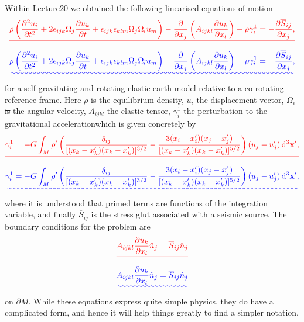 \documentclass[a4paper,12pt]{paper}
\providecommand{\DIFadd}[1]{{\protect\color{blue}\uwave{#1}}} %
\providecommand{\DIFdel}[1]{{\protect\color{red}\sout{#1}}}                      %
\providecommand{\DIFaddbegin}{} %
\providecommand{\DIFaddend}{} %
\providecommand{\DIFdelbegin}{} %
\providecommand{\DIFdelend}{} %
\begin{document}
Within Lecture\DIFdelbegin \DIFdel{20 }\DIFdelend \DIFaddbegin \DIFadd{~21 }\DIFaddend we obtained the following linearised equations of motion
\DIFdelbegin \begin{displaymath}
\DIFdel{\rho\left(\frac{\partial^{2}u_{i}}{\partial t^{2}}+2\epsilon_{ijk}\Omega_{j}\frac{\partial u_{k}}{\partial t}
+\epsilon_{ijk}\epsilon_{klm}\Omega_{j}\Omega_{l}u_{m}\right)-\frac{\partial}{\partial x_{j}}\left(A_{ijkl}\frac{\partial u_{k}}{\partial x_{l}}\right)
-\rho\gamma_{i}^{1}=-\frac{\partial\overline{S}_{ij}}{\partial x_{j}},
}\end{displaymath}%
\DIFdelend \DIFaddbegin \begin{equation}
\DIFadd{\rho\left(\frac{\partial^{2}u_{i}}{\partial t^{2}}+2\epsilon_{ijk}\Omega_{j}\frac{\partial u_{k}}{\partial t}
+\epsilon_{ijk}\epsilon_{klm}\Omega_{j}\Omega_{l}u_{m}\right)-\frac{\partial}{\partial x_{j}}\left(A_{ijkl}\frac{\partial u_{k}}{\partial x_{l}}\right)
-\rho\gamma_{i}^{1}=-\frac{\partial\overline{S}_{ij}}{\partial x_{j}},
\label{eq:1}
}\end{equation}\DIFaddend 
for a self-gravitating and rotating elastic earth model relative to a co-rotating reference frame. Here $\rho$ is the equilibrium density, $u_{i}$ the displacement vector,
 $\Omega_{i}$ \DIFdelbegin \DIFdel{is }\DIFdelend the angular velocity, $A_{ijkl}$ the elastic tensor, \DIFaddbegin \DIFadd{and }\DIFaddend $\gamma_{i}^{1}$ the perturbation to the gravitational acceleration\DIFaddbegin \DIFadd{, }\DIFaddend which is given concretely by
\DIFdelbegin \begin{displaymath}
\DIFdel{\gamma_{i}^{1}=-G\int_{M}\rho'\left(\frac{\delta_{ij}}{[(x_{k}-x_{k}')(x_{k}-x_{k}')]^{3/2}}-\frac{3(x_{i}-x_{i}')(x_{j}-x_{j}')}{[(x_{k}-x_{k}')(x_{k}-x_{k}')]^{5/2}}\right)(u_{j}-u_{j}')\dd^{3}\mathbf{x}',
}\end{displaymath}%
\DIFdelend \DIFaddbegin \begin{equation}
\DIFadd{\gamma_{i}^{1}=-G\int_{M}\rho'\left(\frac{\delta_{ij}}{[(x_{k}-x_{k}')(x_{k}-x_{k}')]^{3/2}}-\frac{3(x_{i}-x_{i}')(x_{j}-x_{j}')}{[(x_{k}-x_{k}')(x_{k}-x_{k}')]^{5/2}}\right)(u_{j}-u_{j}')\dd^{3}\mathbf{x}',
\label{eq:2}
}\end{equation}\DIFaddend 
where it is understood that primed terms are functions of the integration variable, and finally $\overline{S}_{ij}$ is the stress glut associated with a seismic source. 
The boundary conditions for the problem are
\DIFdelbegin \begin{displaymath}
\DIFdel{A_{ijkl}\frac{\partial u_{k}}{\partial x_{l}}\hat{n}_{j}=\overline{S}_{ij}\hat{n}_{j}
}\end{displaymath}%
\DIFdelend \DIFaddbegin \begin{equation}
\DIFadd{A_{ijkl}\frac{\partial u_{k}}{\partial x_{l}}\hat{n}_{j}=\overline{S}_{ij}\hat{n}_{j}
\label{eq:3}
}\end{equation}\DIFaddend 
on $\partial M$. While these equations express quite simple physics, they do have a complicated form, and hence it will help things greatly to find a simpler notation.
\end{document}

